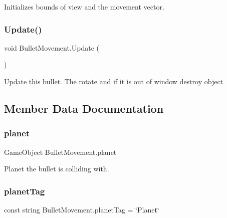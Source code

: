 Initializes bounds of view and the movement vector. 

\mbox{\label{class_bullet_movement_a95545abaf23c8a2120076127df594db3}} 
\subsubsection{\texorpdfstring{Update()}{Update()}}
{\footnotesize\ttfamily void Bullet\+Movement.\+Update (\begin{DoxyParamCaption}{ }\end{DoxyParamCaption})\hspace{0.3cm}{\ttfamily [private]}}



Update this bullet. The rotate and if it is out of window destroy object 



\subsection{Member Data Documentation}
\mbox{\label{class_bullet_movement_a93263de8f413e1abcbf57f3b30b37e50}} 
\subsubsection{\texorpdfstring{planet}{planet}}
{\footnotesize\ttfamily Game\+Object Bullet\+Movement.\+planet\hspace{0.3cm}{\ttfamily [private]}}



Planet the bullet is colliding with. 

\mbox{\label{class_bullet_movement_a8a39e066bf0f84fd7ec143eea687ab12}} 
\subsubsection{\texorpdfstring{planet\+Tag}{planetTag}}
{\footnotesize\ttfamily const string Bullet\+Movement.\+planet\+Tag = \char`\"{}Planet\char`\"{}\hspace{0.3cm}{\ttfamily [private]}}



